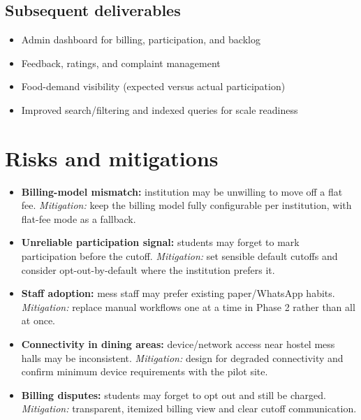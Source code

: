 \documentclass[12pt,a4paper]{article}
\begin{document}
\subsection{Subsequent deliverables}

\begin{itemize}
    \item Admin dashboard for billing, participation, and backlog
    \item Feedback, ratings, and complaint management
    \item Food-demand visibility (expected versus actual participation)
    \item Improved search/filtering and indexed queries for scale readiness
\end{itemize}

\section{Risks and mitigations}

\begin{itemize}
    \item \textbf{Billing-model mismatch:} institution may be unwilling to
    move off a flat fee. \textit{Mitigation:} keep the billing model fully
    configurable per institution, with flat-fee mode as a fallback.
    \item \textbf{Unreliable participation signal:} students may forget to
    mark participation before the cutoff. \textit{Mitigation:} set sensible
    default cutoffs and consider opt-out-by-default where the institution
    prefers it.
    \item \textbf{Staff adoption:} mess staff may prefer existing
    paper/WhatsApp habits. \textit{Mitigation:} replace manual workflows one
    at a time in Phase 2 rather than all at once.
    \item \textbf{Connectivity in dining areas:} device/network access near
    hostel mess halls may be inconsistent. \textit{Mitigation:} design for
    degraded connectivity and confirm minimum device requirements with the
    pilot site.
    \item \textbf{Billing disputes:} students may forget to opt out and still
    be charged. \textit{Mitigation:} transparent, itemized billing view and
    clear cutoff communication.
\end{itemize}
\end{document}
